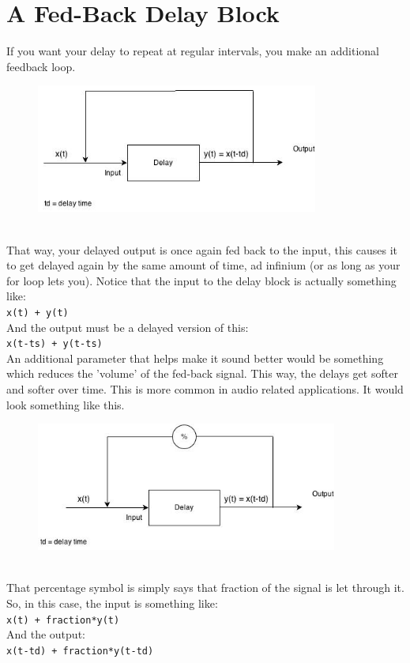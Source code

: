 \documentclass{article}
\begin{document}
\section*{A Fed-Back Delay Block}
If you want your delay to repeat at regular intervals, you make an additional feedback loop.
\begin{figure}[h]
\begin{center}
\includegraphics[height=120pt]{../pictures/image4.jpg}
\end{center}
\end{figure}
\newline \\That way, your delayed output is once again fed back to the input, 
this causes it to get delayed again by the same amount of time, ad infinium 
(or as long as your for loop lets you). Notice that the input to the delay 
block is actually something like:
\newline \\ \texttt{x(t) + y(t)}
\newline \\ And the output must be a delayed version of this:
\newline \\ \texttt{x(t-ts) + y(t-ts)}
\newline \\An additional parameter that helps make it sound better would be 
something which reduces the 'volume' of the fed-back signal. This way, the delays 
get softer and softer over time. This is more common in audio related applications.
It would look something like this. 
\begin{figure}[h]
\begin{center}
\includegraphics[height=120pt]{../pictures/image5.jpg}
\end{center}
\end{figure}
\newline \\ That percentage symbol is simply says that fraction of the signal is let through it.
So, in this case, the input is something like:
\newline \\ \texttt{x(t) + fraction*y(t)}
\newline \\And the output:
\newline \\ \texttt{x(t-td) + fraction*y(t-td)}
\end{document}
